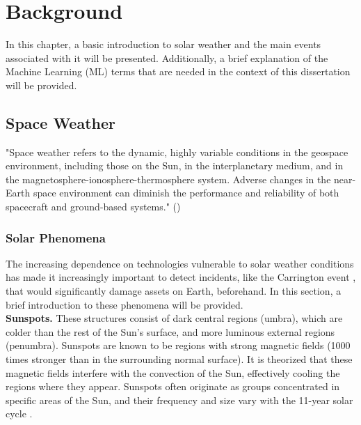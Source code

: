 \chapter{Background}\label{chap:background}
In this chapter, a basic introduction to solar weather and the main events associated with it will be presented. Additionally, a brief explanation of the Machine Learning (ML) terms that are needed in the context of this dissertation will be provided.

\section{Space Weather}
"Space weather refers to the dynamic, highly variable conditions in the geospace environment, including those on the Sun, in the interplanetary medium, and in the magnetosphere-ionosphere-thermosphere system. Adverse changes in the near-Earth space environment can diminish the performance and reliability of both spacecraft and ground-based systems." (\cite{BAKER19987})

\subsection{Solar Phenomena}\label{sec:solar_events}
The increasing dependence on technologies vulnerable to solar weather conditions has made it increasingly important to detect incidents, like the Carrington event \cite{schwenn_SpaceWeatherSolar_2006}, that would significantly damage assets on Earth, beforehand. In this section, a brief introduction to these phenomena will be provided.\\

\noindent\textbf{Sunspots.} These structures consist of dark central regions (umbra), which are colder than the rest of the Sun's surface, and more luminous external regions (penumbra). Sunspots are known to be regions with strong magnetic fields (1000 times stronger than in the surrounding normal surface). It is theorized that these magnetic fields interfere with the convection of the Sun, effectively cooling the regions where they appear. Sunspots often originate as groups concentrated in specific areas of the Sun, and their frequency and size vary with the 11-year solar cycle \cite{moldwin_2008}. \\


